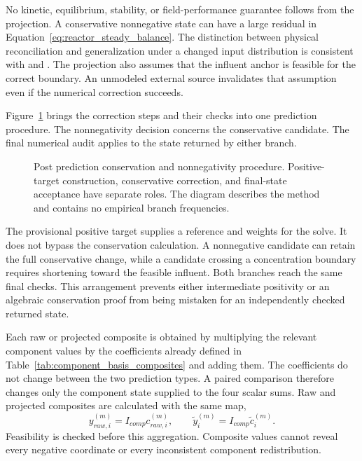 No kinetic, equilibrium, stability, or field-performance guarantee follows from the projection. A conservative nonnegative state can have a large residual in Equation~\eqref{eq:reactor_steady_balance}. The distinction between physical reconciliation and generalization under a changed input distribution is consistent with \citet{Shen2023} and \citet{Valente2025}. The projection also assumes that the influent anchor is feasible for the correct boundary. An unmodeled external source invalidates that assumption even if the numerical correction succeeds.

Figure~\ref{fig:projection_acceptance_flow} brings the correction steps and their checks into one prediction procedure. The nonnegativity decision concerns the conservative candidate. The final numerical audit applies to the state returned by either branch.

\begin{figure}[htbp]
\centering

\caption{Post prediction conservation and nonnegativity procedure. Positive-target construction, conservative correction, and final-state acceptance have separate roles. The diagram describes the method and contains no empirical branch frequencies.}
\label{fig:projection_acceptance_flow}
\end{figure}

The provisional positive target supplies a reference and weights for the solve. It does not bypass the conservation calculation. A nonnegative candidate can retain the full conservative change, while a candidate crossing a concentration boundary requires shortening toward the feasible influent. Both branches reach the same final checks. This arrangement prevents either intermediate positivity or an algebraic conservation proof from being mistaken for an independently checked returned state.

Each raw or projected composite is obtained by multiplying the relevant component values by the coefficients already defined in Table~\ref{tab:component_basis_composites} and adding them. The coefficients do not change between the two prediction types. A paired comparison therefore changes only the component state supplied to the four scalar sums. Raw and projected composites are calculated with the same map,
\begin{equation}
y_{raw,i}^{(m)}=I_{comp}c_{raw,i}^{(m)},\qquad
\tilde y_i^{(m)}=I_{comp}\tilde c_i^{(m)}.
\label{eq:projection_paired_composites}
\end{equation}
Feasibility is checked before this aggregation. Composite values cannot reveal every negative coordinate or every inconsistent component redistribution.

